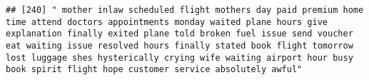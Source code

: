 \documentclass[
]{article}
\begin{document}
\begin{verbatim}
## [240] " mother inlaw scheduled flight mothers day paid premium home time attend doctors appointments monday waited plane hours give explanation finally exited plane told broken fuel issue send voucher eat waiting issue resolved hours finally stated book flight tomorrow lost luggage shes hysterically crying wife waiting airport hour busy book spirit flight hope customer service absolutely awful"                                                                                                                                                                                                                                                                                                                                                                                                                                                                                                                                                                                                                                                                                                                                                                                                                                                                                                                                                                                                                                                                                                                                                                                                                                                                                                                                                                                         

\end{verbatim}
\end{document}
